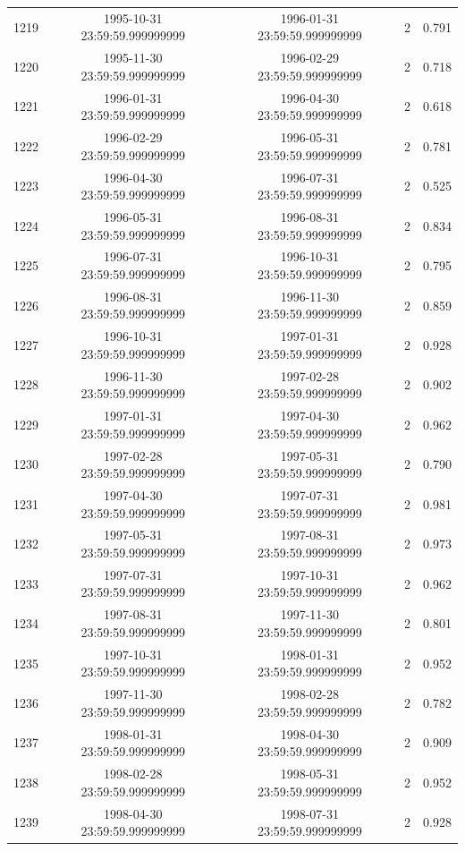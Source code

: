 \begin{table}
\begin{tabular}{lcccc}
1219 & 1995-10-31 23:59:59.999999999 & 1996-01-31 23:59:59.999999999 & 2 & 0.791 \\
1220 & 1995-11-30 23:59:59.999999999 & 1996-02-29 23:59:59.999999999 & 2 & 0.718 \\
1221 & 1996-01-31 23:59:59.999999999 & 1996-04-30 23:59:59.999999999 & 2 & 0.618 \\
1222 & 1996-02-29 23:59:59.999999999 & 1996-05-31 23:59:59.999999999 & 2 & 0.781 \\
1223 & 1996-04-30 23:59:59.999999999 & 1996-07-31 23:59:59.999999999 & 2 & 0.525 \\
1224 & 1996-05-31 23:59:59.999999999 & 1996-08-31 23:59:59.999999999 & 2 & 0.834 \\
1225 & 1996-07-31 23:59:59.999999999 & 1996-10-31 23:59:59.999999999 & 2 & 0.795 \\
1226 & 1996-08-31 23:59:59.999999999 & 1996-11-30 23:59:59.999999999 & 2 & 0.859 \\
1227 & 1996-10-31 23:59:59.999999999 & 1997-01-31 23:59:59.999999999 & 2 & 0.928 \\
1228 & 1996-11-30 23:59:59.999999999 & 1997-02-28 23:59:59.999999999 & 2 & 0.902 \\
1229 & 1997-01-31 23:59:59.999999999 & 1997-04-30 23:59:59.999999999 & 2 & 0.962 \\
1230 & 1997-02-28 23:59:59.999999999 & 1997-05-31 23:59:59.999999999 & 2 & 0.790 \\
1231 & 1997-04-30 23:59:59.999999999 & 1997-07-31 23:59:59.999999999 & 2 & 0.981 \\
1232 & 1997-05-31 23:59:59.999999999 & 1997-08-31 23:59:59.999999999 & 2 & 0.973 \\
1233 & 1997-07-31 23:59:59.999999999 & 1997-10-31 23:59:59.999999999 & 2 & 0.962 \\
1234 & 1997-08-31 23:59:59.999999999 & 1997-11-30 23:59:59.999999999 & 2 & 0.801 \\
1235 & 1997-10-31 23:59:59.999999999 & 1998-01-31 23:59:59.999999999 & 2 & 0.952 \\
1236 & 1997-11-30 23:59:59.999999999 & 1998-02-28 23:59:59.999999999 & 2 & 0.782 \\
1237 & 1998-01-31 23:59:59.999999999 & 1998-04-30 23:59:59.999999999 & 2 & 0.909 \\
1238 & 1998-02-28 23:59:59.999999999 & 1998-05-31 23:59:59.999999999 & 2 & 0.952 \\
1239 & 1998-04-30 23:59:59.999999999 & 1998-07-31 23:59:59.999999999 & 2 & 0.928 \\

\end{tabular}
\end{table}

